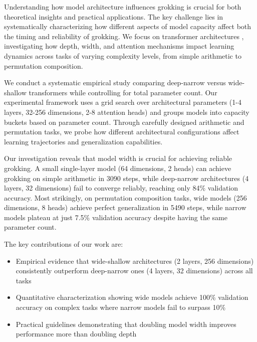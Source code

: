 \documentclass{article} %
\begin{document}
Understanding how model architecture influences grokking is crucial for both theoretical insights and practical applications. The key challenge lies in systematically characterizing how different aspects of model capacity affect both the timing and reliability of grokking. We focus on transformer architectures \citep{vaswani2017attention}, investigating how depth, width, and attention mechanisms impact learning dynamics across tasks of varying complexity levels, from simple arithmetic to permutation composition.

We conduct a systematic empirical study comparing deep-narrow versus wide-shallow transformers while controlling for total parameter count. Our experimental framework uses a grid search over architectural parameters (1-4 layers, 32-256 dimensions, 2-8 attention heads) and groups models into capacity buckets based on parameter count. Through carefully designed arithmetic and permutation tasks, we probe how different architectural configurations affect learning trajectories and generalization capabilities.

Our investigation reveals that model width is crucial for achieving reliable grokking. A small single-layer model (64 dimensions, 2 heads) can achieve grokking on simple arithmetic in 3090 steps, while deep-narrow architectures (4 layers, 32 dimensions) fail to converge reliably, reaching only 84\% validation accuracy. Most strikingly, on permutation composition tasks, wide models (256 dimensions, 8 heads) achieve perfect generalization in 5490 steps, while narrow models plateau at just 7.5\% validation accuracy despite having the same parameter count.

The key contributions of our work are:
\begin{itemize}
    \item Empirical evidence that wide-shallow architectures (2 layers, 256 dimensions) consistently outperform deep-narrow ones (4 layers, 32 dimensions) across all tasks
    \item Quantitative characterization showing wide models achieve 100\% validation accuracy on complex tasks where narrow models fail to surpass 10\%
    \item Practical guidelines demonstrating that doubling model width improves performance more than doubling depth
\end{itemize}
\end{document}

